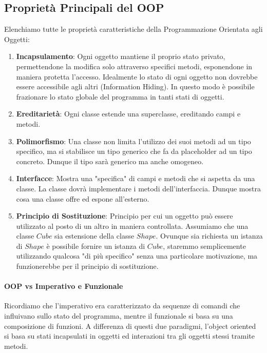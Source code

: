 \documentclass{article}
\begin{document}
\subsection{Proprietà Principali del OOP}

Elenchiamo tutte le proprietà caratteristiche della Programmazione Orientata agli Oggetti:

\begin{enumerate}
    \item \textbf{Incapsulamento}: Ogni oggetto mantiene il proprio stato privato, permettendone la modifica solo attraverso specifici metodi, esponendone in maniera protetta l'accesso. Idealmente lo stato di ogni oggetto non dovrebbe essere accessibile agli altri (Information Hiding). In questo modo è possibile frazionare lo stato globale del programma in tanti stati di oggetti.
    \item \textbf{Ereditarietà}: Ogni classe estende una superclasse, ereditando campi e metodi.
    \item \textbf{Polimorfismo}: Una classe non limita l'utilizzo dei suoi metodi ad un tipo specifico, ma si stabilisce un tipo generico che fa da placeholder ad un tipo concreto. Dunque il tipo sarà generico ma anche omogeneo.
    \item \textbf{Interfacce}: Mostra una "specifica" di campi e metodi che si aspetta da una classe. La classe dovrà implementare i metodi dell'interfaccia. Dunque mostra cosa una classe offre ed espone all'esterno.
    \item \textbf{Principio di Sostituzione}: Principio per cui un oggetto può essere utilizzato al posto di un altro in maniera controllata. Assumiamo che una classe $Cube$ sia estensione della classe $Shape$. Ovunque sia richiesta un istanza di $Shape$ è possibile fornire un istanza di $Cube$, staremmo semplicemente utilizzando qualcosa "di più specifico" senza una particolare motivazione, ma funzionerebbe per il principio di sostituzione.
\end{enumerate}

\vspace*{15px}

\paragraph{OOP vs Imperativo e Funzionale} Ricordiamo che l'imperativo era caratterizzato da sequenze di comandi che influivano sullo stato del programma, mentre il funzionale si basa su una composizione di funzioni. A differenza di questi due paradigmi, l'object oriented si basa su stati incapsulati in oggetti ed interazioni tra gli oggetti stessi tramite metodi.
\end{document}
